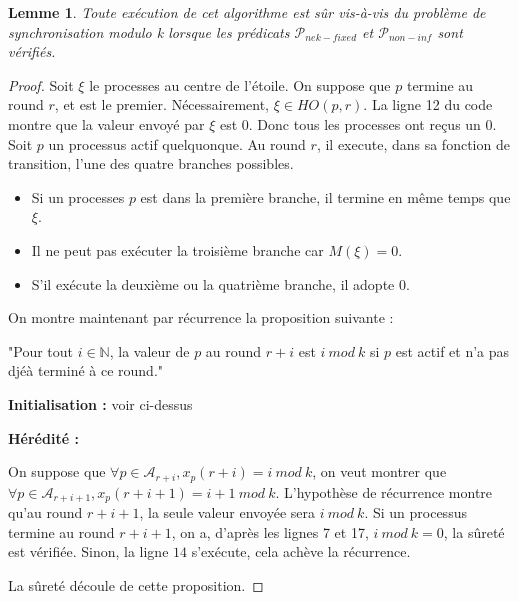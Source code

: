 \documentclass{article}
\newtheorem{lemma}{Lemme}
\begin{document}
\begin{lemma}
	Toute exécution de cet algorithme est sûr vis-à-vis du problème de synchronisation modulo k lorsque les prédicats $\mathcal{P}_{nek-fixed}$ et $\mathcal{P}_{non-inf}$ sont vérifiés.
\end{lemma}
\begin{proof}

	Soit $\xi$ le processes au centre de l'étoile.
	On suppose que $p$ termine au round $r$, et est le premier. Nécessairement, $\xi \in HO(p,r)$.
	La ligne 12 du code montre que la valeur envoyé par $\xi$ est $0$.
	Donc tous les processes ont reçus un $0$. Soit $p$ un processus actif quelquonque. Au round $r$, il execute, dans sa fonction de transition, l'une des quatre branches possibles.
	\begin{itemize}

		\item Si un processes $p$ est dans la première branche, il termine en même temps que $\xi$.
		\item Il ne peut pas exécuter la troisième branche car $M(\xi) = 0$.
		\item S'il exécute la deuxième ou la quatrième branche, il adopte $0$.

	\end{itemize}

	On montre maintenant par récurrence la proposition suivante :

	"Pour tout $i \in \mathds{N}$, la valeur de $p$ au round $r+i$ est $i~mod~k$ si $p$ est actif et n'a pas djéà terminé à ce round."

	\textbf{Initialisation : } voir ci-dessus

	\textbf{Hérédité :}

	On suppose que $\forall p \in \mathcal{A}_{r+i}, x_p(r+i) = i~mod~k$, on veut montrer que $\forall p \in \mathcal{A}_{r+i+1}, x_p(r+i+1) = i+1~mod~k$.
	L'hypothèse de récurrence montre qu'au round $r+i+1$, la seule valeur envoyée sera $i~mod~k$.
	Si un processus termine au round $r+i+1$, on a, d'après les lignes 7 et 17, $i~mod~k = 0$, la sûreté est vérifiée.
	Sinon, la ligne $14$ s'exécute, cela achève la récurrence.

	La sûreté découle de cette proposition.

\end{proof}
\end{document}
